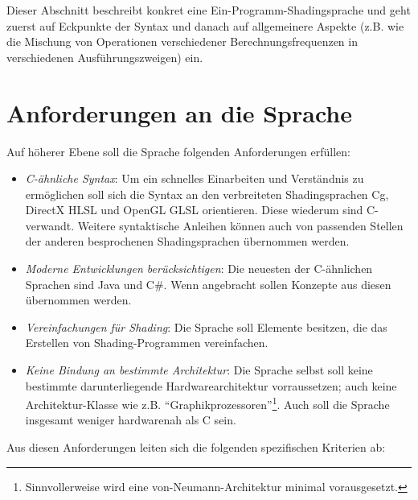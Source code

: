 Dieser Abschnitt beschreibt konkret eine Ein-Programm-Shadingsprache und geht zuerst auf Eckpunkte der Syntax und danach
auf allgemeinere Aspekte (z.B. wie die Mischung von Operationen verschiedener Berechnungsfrequenzen in verschiedenen Ausführungszweigen) ein.

\section{Anforderungen an die Sprache}

Auf höherer Ebene soll die Sprache folgenden Anforderungen erfüllen:
\begin{itemize}
\item \emph{C-ähnliche Syntax}: Um ein schnelles Einarbeiten und Verständnis zu ermöglichen soll sich die Syntax an den verbreiteten
Shadingsprachen Cg, DirectX HLSL und OpenGL GLSL orientieren. Diese wiederum sind C-verwandt.
Weitere syntaktische Anleihen können auch von passenden Stellen der anderen besprochenen  Shadingsprachen übernommen werden.
\item \emph{Moderne Entwicklungen berücksichtigen}: Die neuesten der C-ähnlichen Sprachen sind Java und C\#. Wenn angebracht sollen
Konzepte aus diesen übernommen werden.
\item \emph{Vereinfachungen für Shading}: Die Sprache soll Elemente besitzen, die das Erstellen von Shading-Programmen
vereinfachen. \item \emph{Keine Bindung an bestimmte Architektur}: Die Sprache selbst soll keine bestimmte darunterliegende Hardwarearchitektur
vorraussetzen; auch keine Architektur-Klasse wie z.B. "`Graphikprozessoren"'\footnote{Sinnvollerweise wird eine von-Neumann-Architektur minimal vorausgesetzt.}.
Auch soll die Sprache insgesamt weniger hardwarenah als C sein.
\end{itemize}


Aus diesen Anforderungen leiten sich die folgenden spezifischen Kriterien ab:


